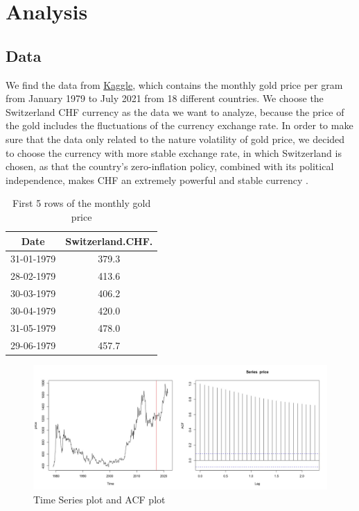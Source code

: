 \documentclass[paper=letter, fontsize=11pt]{scrartcl}
\begin{document}
\section{Analysis}

\subsection{Data}

We find the data from \href{https://www.kaggle.com/datasets/odins0n/monthly-gold-prices?select=1979-2021.csv}{Kaggle}, which contains the monthly gold price per gram from January 1979 to July 2021 from 18 different countries. We choose the Switzerland CHF currency as the data we want to analyze, because the price of the gold includes the fluctuations of the currency exchange rate. In order to make sure that the data only related to the nature volatility of gold price, we decided to choose the currency with more stable exchange rate, in which Switzerland is chosen, as that the country's zero-inflation policy, combined with its political independence, makes CHF an extremely powerful and stable currency \cite{CFI}.

\begin{table}[H]
\centering
\begin{tabular}{|c|c|}
\hline
Date & Switzerland.CHF. \\
\hline\hline
31-01-1979 &  379.3 \\
28-02-1979 &  413.6 \\
30-03-1979   & 406.2 \\
30-04-1979   & 420.0 \\
31-05-1979   & 478.0 \\
29-06-1979   & 457.7 \\
\hline
\end{tabular}
\caption{First 5 rows of the monthly gold price}
\label{table:head}
\end{table}
\vspace{-1cm}
\begin{figure}[H]
    \centering
    \includegraphics[width=\linewidth]{Image/intro-plot.jpeg}
    \caption{Time Series plot and ACF plot}
    \label{fig:intro-plots}
\end{figure}
\end{document}
